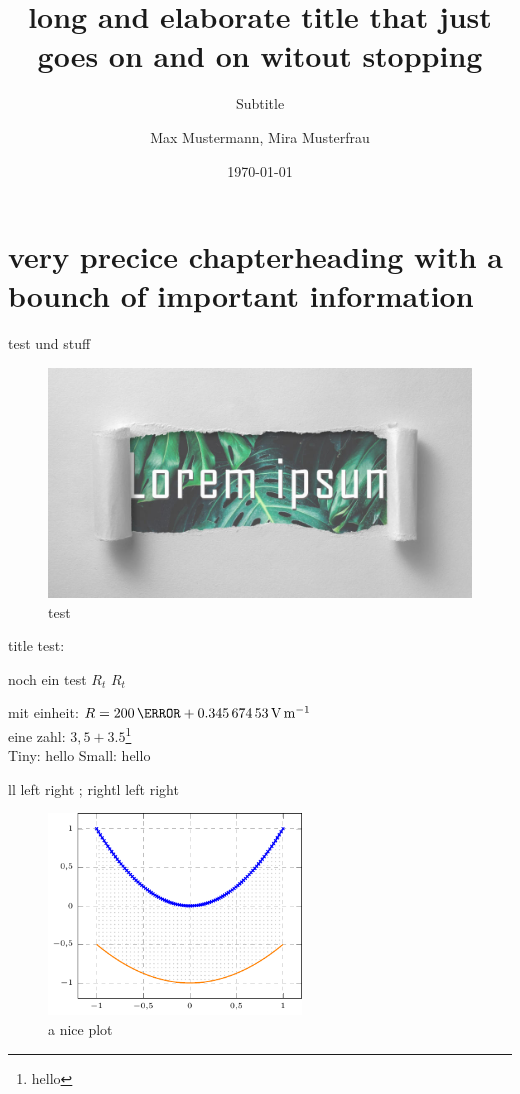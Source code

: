 \documentclass[twoside,f1]{HsH-report}
\author{
	Max Mustermann,
	Mira Musterfrau
}
\title[short title]{long and elaborate title that just goes on and on witout stopping}
\subtitle{Subtitle}
\date{\today}
\begin{document}
\maketitle
\declarationAuthorship

\begin{abstract}
	\lipsum[5-8]
\end{abstract}

\tableofcontents

\cleardoublepage %

\chapter{very precice chapterheading with a bounch of important information}
	\label{chap: one}
	{\color{red}test} und stuff
	\begin{figure}
		\centering
		\includegraphics[width=.6\textwidth]{img/lorem-ipsum.jpg}
		\caption{test}
	\end{figure}

	title test: \ifx\@shorttitle\@empty\@title\else\@shorttitle\fi

	noch ein test \normalsubscripts$R_t$ \upsubscripts$R_t$

	mit einheit: $R=200\,\mohm+ \SI{0.34567453}{\volt\per\metre}$
	\cite{laboranleitung:physik}
	\vspace{2cm}\\
	eine zahl: $3,5+3.5$\footnote[1]{hello}\\

	Tiny: {\tiny hello} Small: {\small hello}

	\makeatletter
	\newcommand{\test}[1][l]{
		{
			\def\t{#1}
			\if\t l left
			\else
				right
			\fi
		}
	}
	\test; \test[right]

	\lipsum[5-6]

	\pagebreak
	\begin{figure}
		\centering
		\includegraphics[width=0.6\textwidth, page=2]{plt/examplePlot.pdf}
		\caption{a nice plot}
	\end{figure}
\end{document}
